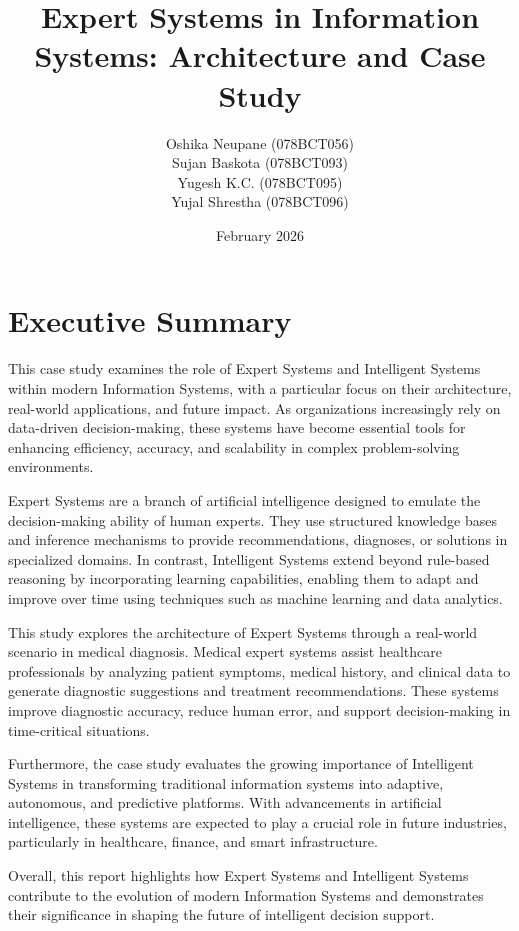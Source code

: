 \documentclass[12pt]{article}
\title{Expert Systems in Information Systems: Architecture and Case Study}
\author{
Oshika Neupane (078BCT056) \\
Sujan Baskota (078BCT093)  \\
Yugesh K.C. (078BCT095)    \\
Yujal Shrestha (078BCT096)
}
\date{February 2026}
\begin{document}
\maketitle 
\newpage



\tableofcontents

\newpage



\section{Executive Summary}

This case study examines the role of Expert Systems and Intelligent Systems within modern Information Systems, with a particular focus on their architecture, real-world applications, and future impact. As organizations increasingly rely on data-driven decision-making, these systems have become essential tools for enhancing efficiency, accuracy, and scalability in complex problem-solving environments.

Expert Systems are a branch of artificial intelligence designed to emulate the decision-making ability of human experts. They use structured knowledge bases and inference mechanisms to provide recommendations, diagnoses, or solutions in specialized domains. In contrast, Intelligent Systems extend beyond rule-based reasoning by incorporating learning capabilities, enabling them to adapt and improve over time using techniques such as machine learning and data analytics.

This study explores the architecture of Expert Systems through a real-world scenario in medical diagnosis. Medical expert systems assist healthcare professionals by analyzing patient symptoms, medical history, and clinical data to generate diagnostic suggestions and treatment recommendations. These systems improve diagnostic accuracy, reduce human error, and support decision-making in time-critical situations.

Furthermore, the case study evaluates the growing importance of Intelligent Systems in transforming traditional information systems into adaptive, autonomous, and predictive platforms. With advancements in artificial intelligence, these systems are expected to play a crucial role in future industries, particularly in healthcare, finance, and smart infrastructure.

Overall, this report highlights how Expert Systems and Intelligent Systems contribute to the evolution of modern Information Systems and demonstrates their significance in shaping the future of intelligent decision support.
\end{document}
